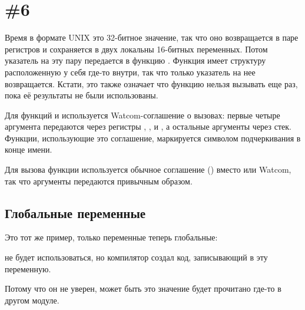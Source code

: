 \section{\Example{} \#6}





Время в формате UNIX это 32-битное значение, так что оно возвращается в паре регистров  и сохраняется
в двух локальны 16-битных переменных.
Потом указатель на эту пару передается в функцию
.
Функция  имеет структуру  расположенную у себя
где-то внутри, так что только указатель на нее возвращается. 
Кстати, это также означает что функцию нельзя вызывать еще раз, пока её результаты не были использованы.

Для функций  и  используется
Watcom-соглашение о вызовах: первые четыре аргумента передаются через регистры
, ,  и , а остальные аргументы через стек.
Функции, использующие это соглашение, маркируется символом подчеркивания в конце имени.

Для вызова функции  используется обычное соглашение  () вместо 
 или Watcom, так что аргументы передаются привычным образом.

\subsection{Глобальные переменные}

Это тот же пример, только переменные теперь глобальные:





 не будет использоваться, но компилятор создал код, записывающий в эту переменную.

Потому что он не уверен, может быть это значение будет прочитано где-то в другом модуле.


